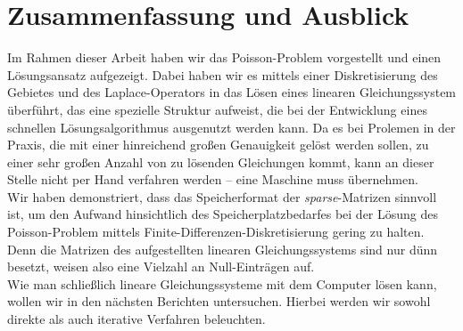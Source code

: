 \documentclass{scrartcl}
\begin{document}
\pagebreak
\section{Zusammenfassung und Ausblick}
Im Rahmen dieser Arbeit haben wir das Poisson-Problem vorgestellt und einen Lösungsansatz aufgezeigt.
Dabei haben wir es mittels einer Diskretisierung des Gebietes und des Laplace-Operators in das Lösen eines linearen Gleichungssystem überführt, das eine spezielle Struktur aufweist, die bei der Entwicklung eines schnellen Lösungsalgorithmus ausgenutzt werden kann.
Da es bei Prolemen in der Praxis, die mit einer hinreichend großen Genauigkeit gelöst werden sollen, zu einer sehr großen Anzahl von zu lösenden Gleichungen kommt, kann an dieser Stelle nicht per Hand verfahren werden -- eine Maschine muss übernehmen.\\
Wir haben demonstriert, dass das Speicherformat der \textit{sparse}-Matrizen sinnvoll ist, um den Aufwand hinsichtlich des Speicherplatzbedarfes bei der Lösung des Poisson-Problem mittels Finite-Differenzen-Diskretisierung gering zu halten.
Denn die Matrizen des aufgestellten linearen Gleichungssystems sind nur dünn besetzt, weisen also eine Vielzahl an Null-Einträgen auf.\\
Wie man schließlich lineare Gleichungssysteme mit dem Computer lösen kann, wollen wir in den nächsten Berichten untersuchen.
Hierbei werden wir sowohl direkte als auch iterative Verfahren beleuchten.

\pagebreak



\end{document}
